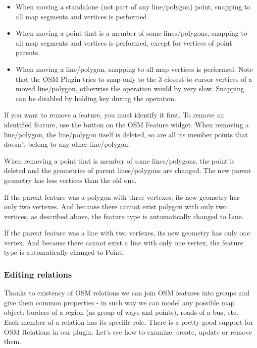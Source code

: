 \begin{itemize}
\item When moving a standalone (not part of any line/polygon) point, 
snapping to all map segments and vertices is performed.
\item When moving a point that is a member of some lines/polygons, 
snapping to all map segments and vertices is performed, except for 
vertices of point parents.
\item When moving a line/polygon, snapping to all map vertices is performed. 
Note that the OSM Plugin tries to snap only to the 3 closest-to-cursor 
vertices of a moved line/polygon, otherwise the operation would by very slow.
Snapping can be disabled by holding  key during the operation.
\end{itemize}


If you want to remove a feature, you must identify it first. To remove 
an identified feature, use the  button on the OSM Feature widget. When removing a line/polygon, 
the line/polygon itself is deleted, so are all its member points that 
doesn't belong to any other line/polygon. 

When removing a point that is member of some lines/polygons, the point is 
deleted and the geometries of parent lines/polygons are changed. The new 
parent geometry has less vertices than the old one.

If the parent feature was a polygon with three vertexes, its new geometry 
has only two vertexes. And because there cannot exist polygon with only two 
vertices, as described above, the feature type is automatically changed to 
Line.

If the parent feature was a line with two vertexes, its new geometry has 
only one vertex. And because there cannot exist a line with only one vertex, 
the feature type is automatically changed to Point.

\subsubsection{Editing relations}\label{editing_osm_relation}

Thanks to existency of OSM relations we can join OSM features into groups and
give them common properties - in such way we can model any possible map
object: borders of a region (as group of ways and points), roads of a bus,
etc. Each member of a relation has its specific role. There is a pretty good 
support for OSM Relations in our plugin. Let's see how to examine, create, 
update or remove them.

